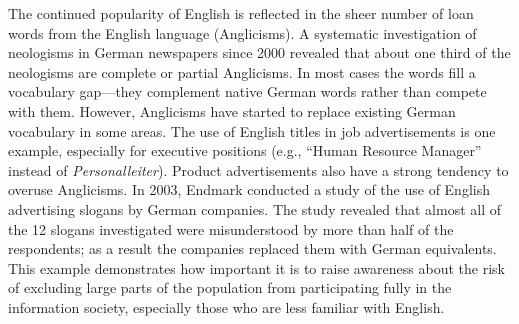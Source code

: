 \documentclass[]{../../metanetpaper}
\begin{document}
\begin{Parallel}[c]{79mm}{78mm}
{The continued popularity of English is reflected in the sheer number of loan words from the English language (Anglicisms). A systematic investigation of neologisms in German newspapers since 2000 revealed that about one third of the neologisms are complete or partial Anglicisms\cite{Lemni1}. In most cases the words fill a vocabulary gap—they complement native German words rather than compete with them. However, Anglicisms have started to replace existing German vocabulary in some areas. The use of English titles in job advertisements is one example, especially for executive positions (e.g., “Human Resource Manager” instead of \textit{Personalleiter}). Product advertisements also have a strong tendency to overuse Anglicisms. In 2003, Endmark conducted a study of the use of English advertising slogans by German companies. The study revealed that almost all of the 12 slogans investigated were misunderstood by more than half of the respondents; as a result the companies replaced them with German equivalents. This example demonstrates how important it is to raise awareness about the risk of excluding large parts of the population from participating fully in the information society, especially those who are less familiar with English. 
  }

  \ParallelPar



\end{Parallel}
\end{document}
